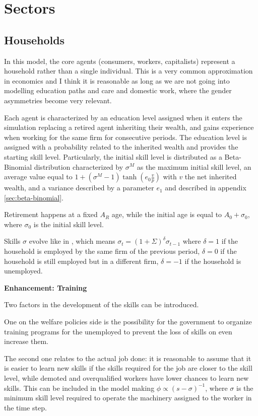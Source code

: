 \documentclass[a4paper, headings=standardclasses]{scrartcl}
\newenvironment{enh}[1][]{\begin{framed}\noindent\textbf{Enhancement: #1}\par}{\end{framed}}
\begin{document}
\section{Sectors}
\subsection{Households}
In this model, the core agents (consumers, workers, capitalists) represent a household rather than a single individual. This is a very common approximation in economics and I think it is reasonable as long as we are not going into modelling education paths and care and domestic work, where the gender asymmetries become very relevant.

Each agent is characterized by an education level assigned when it enters the simulation replacing a retired agent inheriting their wealth, and gains experience when working for the same firm for consecutive periods.
The education level is assigned with a probability related to the inherited wealth and provides the starting skill level.
Particularly, the initial skill level is distributed as a Beta-Binomial distribution characterized by $\sigma^M$ as the maximum initial skill level, an average value equal to $1+(\sigma^M-1)\tanh(e_0 \frac{v}{p})$ with $v$ the net inherited wealth, and a variance described by a parameter $e_1$ and described in appendix \ref{sec:beta-binomial}.

Retirement happens at a fixed $A_R$ age, while the initial age is equal to $A_0 + \sigma_0$, where $\sigma_0$ is the initial skill level.

Skills $\sigma$ evolve like in \textcite{dosi2018}, which means $\sigma_t = (1+\Sigma)^\delta \sigma_{t-1}$ where $\delta=1$ if the household is employed by the same firm of the previous period, $\delta=0$ if the household is still employed but in a different firm, $\delta=-1$ if the household is unemployed.

\begin{enh}[Training]
    Two factors in the development of the skills can be introduced.

    One on the welfare policies side is the possibility for the government to organize training programs for the unemployed to prevent the loss of skills on even increase them.

    The second one relates to the actual job done: it is reasonable to assume that it is easier to learn new skills if the skills required for the job are closer to the skill level, while demoted and overqualified workers have lower chances to learn new skills. This can be included in the model making $\phi \propto (s-\sigma)^{-1}$, where $\sigma$ is the minimum skill level required to operate the machinery assigned to the worker in the time step.
\end{enh}
\end{document}
